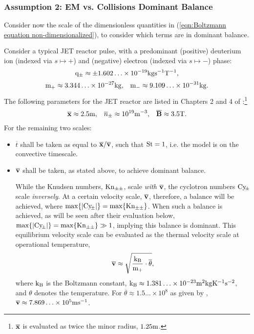 \subsubsection*{Assumption 2: EM vs. Collisions Dominant Balance}
    Consider now the scale of the dimensionless quantities in (\ref{eqn:Boltzmann equation non-dimensionalized}), to consider which terms are in dominant balance.
    
    Consider a typical JET reactor pulse, with a predominant (positive) deuterium ion (indexed via $s  \mapsto  +$) and (negative) electron (indexed via $s  \mapsto  -$) phase:
    \begin{equation}
        \mathrm{q}_{\pm}  \approx  \pm 1.602\ldots\times 10^{- 19}{\rm kg}\mathrm{s}^{- 1}\mathrm{T}^{- 1},
    \end{equation}
    \begin{align}
        \mathrm{m}_{+}    \approx  3.344\ldots\times 10^{- 27}{\rm kg},  &&
        \mathrm{m}_{-}    \approx  9.109\ldots\times 10^{- 31}{\rm kg}.
    \end{align}
    The following parameters for the JET reactor are listed in Chapters 2 and 4 of \cite{Wes00}:\footnote{$\overline{\mathbf{x}}$ is evaluated as twice the minor radius, $1.25\mathrm{m}$.}
    \begin{align}
        \overline{\mathbf{x}}     \approx  2.5\mathrm{m},  &&
        \overline{n}_{\pm}  \approx  10^{19}\mathrm{m}^{- 3},  &&
        \overline{\mathbf{B}}     \approx  3.5\mathrm{T}.
    \end{align}
    For the remaining two scales:
    \begin{itemize}
        \item  $\overline{t}$ shall be taken as equal to $\overline{\mathbf{x}}/\overline{\mathbf{v}}$, such that $\mathrm{St}  =  1$, i.e. the model is on the convective timescale.

        \item  $\overline{\mathbf{v}}$ shall be taken, as stated above, to achieve dominant balance.
        
        While the Knudsen numbers, $\mathrm{Kn}_{\pm\pm}$, scale \emph{with} $\overline{\mathbf{v}}$, the cyclotron numbers $\mathrm{Cy}\!_{\pm}$ scale \emph{inversely}. At a certain velocity scale, $\overline{\mathbf{v}}$, therefore, a balance will be achieved, where $\max\{|\mathrm{Cy}\!_{\pm}|\}  =  \max\{\mathrm{Kn}_{\pm\pm}\}$. When such a balance is achieved, as will be seen after their evaluation below, $\max\{|\mathrm{Cy}\!_{\pm}|\}  =  \max\{\mathrm{Kn}_{\pm\pm}\}  \gg  1$, implying this balance is dominant. This equilibrium velocity scale can be evaluated as the thermal velocity scale at operational temperature,
        \begin{equation}
            \overline{\mathbf{v}}  \approx  \sqrt{\frac{\mathrm{k}_{\mathrm{B}}}{\mathrm{m}_{+}}\cdot\overline{\theta}},
        \end{equation}
        where $\mathrm{k}_{\mathrm{B}}$ is the Boltzmann constant, $\mathrm{k}_{\mathrm{B}}  \approx  1.381\ldots\times 10^{- 23}\mathrm{m}^{2}{\rm kg}\mathrm{K}^{- 1}\mathrm{s}^{- 2}$, and $\theta$ denotes the temperature. For $\overline{\theta}  \approx  1.5\ldots\times 10^{8}$ as given by \cite{Wes00}, $\overline{\mathbf{v}}  \approx  7.869\ldots\times 10^{5}\mathrm{m}\mathrm{s}^{- 1}$.
    \end{itemize}

